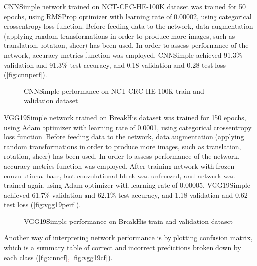 CNNSimple network trained on NCT-CRC-HE-100K dataset was trained for 50 epochs, using RMSProp optimizer with learning rate of 0.00002, using categorical crossentropy loss function. Before feeding data to the network, data augmentation (applying random transformations in order to produce more images, such as translation, rotation, sheer) has been used. In order to assess performance of the network, accuracy metrics function was employed. CNNSimple achieved 91.3\% validation and 91.3\% test accuracy, and 0.18 validation and 0.28 test loss (\textcolor{red}{\autoref{fig:cnnperf}}).

\begin{figure}[h]
	\centering
	\caption{CNNSimple performance on NCT-CRC-HE-100K train and validation dataset}
	\label{fig:cnnperf}
\end{figure}
\clearpage

VGG19Simple network trained on BreakHis dataset was trained for 150 epochs, using Adam optimizer with learning rate of 0.0001, using categorical crossentropy loss function. Before feeding data to the network, data augmentation (applying random transformations in order to produce more images, such as translation, rotation, sheer) has been used. In order to assess performance of the network, accuracy metrics function was employed. After training network with frozen convolutional base, last convolutional block was unfreezed, and network was trained again using Adam optimizer with learning rate of 0.00005. VGG19Simple achieved 61.7\% validation and 62.1\% test accuracy, and 1.18 validation and 0.62 test loss (\textcolor{red}{\autoref{fig:vgg19perf}}).

\begin{figure}[h]
	\centering
	\caption{VGG19Simple performance on BreakHis train and validation dataset}
	\label{fig:vgg19perf}
\end{figure}

Another way of interpreting network performance is by plotting confusion matrix, which is a summary table of correct and incorrect predictions broken down by each class (\textcolor{red}{\autoref{fig:cnncf}, \autoref{fig:vgg19cf}}).

